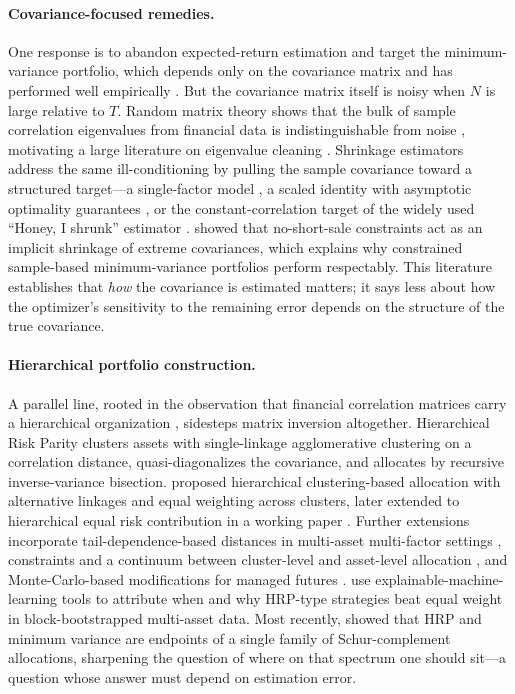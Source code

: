 \documentclass[11pt]{article}
\begin{document}
\paragraph{Covariance-focused remedies.}
One response is to abandon expected-return estimation and target the
minimum-variance portfolio, which depends only on the covariance matrix and
has performed well empirically \citep{clarke2006minimum,clarke2011minimum}.
But the covariance matrix itself is noisy when $N$ is large relative to $T$.
Random matrix theory shows that the bulk of sample correlation eigenvalues
from financial data is indistinguishable from noise
\citep{laloux1999noise,plerou1999universal}, motivating a large literature on
eigenvalue cleaning \citep{bun2017cleaning}. Shrinkage estimators address the
same ill-conditioning by pulling the sample covariance toward a structured
target---a single-factor model \citep{ledoit2003improved}, a scaled identity
with asymptotic optimality guarantees \citep{ledoit2004well}, or the
constant-correlation target of the widely used ``Honey, I shrunk'' estimator
\citep{ledoit2004honey}. \citet{jagannathan2003risk} showed that no-short-sale
constraints act as an implicit shrinkage of extreme covariances, which
explains why constrained sample-based minimum-variance portfolios perform
respectably. This literature establishes that \emph{how} the covariance is
estimated matters; it says less about how the optimizer's sensitivity to the
remaining error depends on the structure of the true covariance.

\paragraph{Hierarchical portfolio construction.}
A parallel line, rooted in the observation that financial correlation
matrices carry a hierarchical organization \citep{mantegna1999hierarchical},
sidesteps matrix inversion altogether. Hierarchical Risk Parity
\citep{lopezdeprado2016building} clusters assets with single-linkage
agglomerative clustering on a correlation distance, quasi-diagonalizes the
covariance, and allocates by recursive inverse-variance bisection.
\citet{raffinot2017hierarchical} proposed hierarchical clustering-based
allocation with alternative linkages and equal weighting across clusters,
later extended to hierarchical equal risk contribution in a working paper
\citep{raffinot2018herc}. Further extensions incorporate
tail-dependence-based distances in multi-asset multi-factor settings
\citep{lohre2020hierarchical}, constraints and a continuum between
cluster-level and asset-level allocation \citep[a working
paper]{pfitzinger2019constrained}, and Monte-Carlo-based modifications for
managed futures \citep{molyboga2020modified}. \citet{jaeger2021interpretable}
use explainable-machine-learning tools to attribute when and why HRP-type
strategies beat equal weight in block-bootstrapped multi-asset data. Most
recently, \citet{cotton2024schur} showed that HRP and minimum variance are
endpoints of a single family of Schur-complement allocations, sharpening the
question of where on that spectrum one should sit---a question whose answer
must depend on estimation error.
\end{document}
